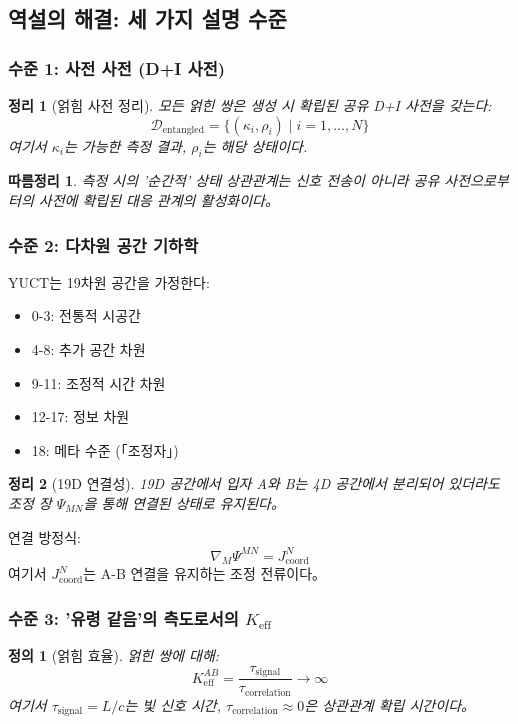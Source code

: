 \documentclass[11pt,a4paper]{article}
\newtheorem{theorem}{정리}
\newtheorem{definition}{정의}
\newtheorem{corollary}{따름정리}
\begin{document}
\subsection{역설의 해결: 세 가지 설명 수준}
\label{subsec:three-levels}

\subsubsection{수준 1: 사전 사전 (D+I 사전)}
\begin{theorem}[얽힘 사전 정리]
모든 얽힌 쌍은 생성 시 확립된 공유 D+I 사전을 갖는다:
\begin{equation}
	\mathcal{D}_{\text{entangled}} = \{(\kappa_i, \rho_i) \mid i = 1,\dots,N\}
\end{equation}
여기서 $\kappa_i$는 가능한 측정 결과, $\rho_i$는 해당 상태이다.
\end{theorem}

\begin{corollary}
측정 시의 '순간적' 상태 상관관계는 신호 전송이 아니라 공유 사전으로부터의 사전에 확립된 대응 관계의 활성화이다。
\end{corollary}

\subsubsection{수준 2: 다차원 공간 기하학}
YUCT는 19차원 공간을 가정한다:
\begin{itemize}
\item 0-3: 전통적 시공간
\item 4-8: 추가 공간 차원
\item 9-11: 조정적 시간 차원
\item 12-17: 정보 차원
\item 18: 메타 수준 (「조정자」)
\end{itemize}

\begin{theorem}[19D 연결성]
19D 공간에서 입자 A와 B는 4D 공간에서 분리되어 있더라도 조정 장 $\Psi_{MN}$을 통해 연결된 상태로 유지된다。
\end{theorem}

연결 방정식:
\begin{equation}
\nabla_M \Psi^{MN} = J^N_{\text{coord}}
\end{equation}
여기서 $J^N_{\text{coord}}$는 A-B 연결을 유지하는 조정 전류이다。

\subsubsection{수준 3: '유령 같음'의 측도로서의 $K_{\mathrm{eff}}$}
\begin{definition}[얽힘 효율]
얽힌 쌍에 대해:
\begin{equation}
	K_{\mathrm{eff}}^{AB} = \frac{\tau_{\text{signal}}}{\tau_{\text{correlation}}} \to \infty
\end{equation}
여기서 $\tau_{\text{signal}} = L/c$는 빛 신호 시간, $\tau_{\text{correlation}} \approx 0$은 상관관계 확립 시간이다。
\end{definition}
\end{document}
